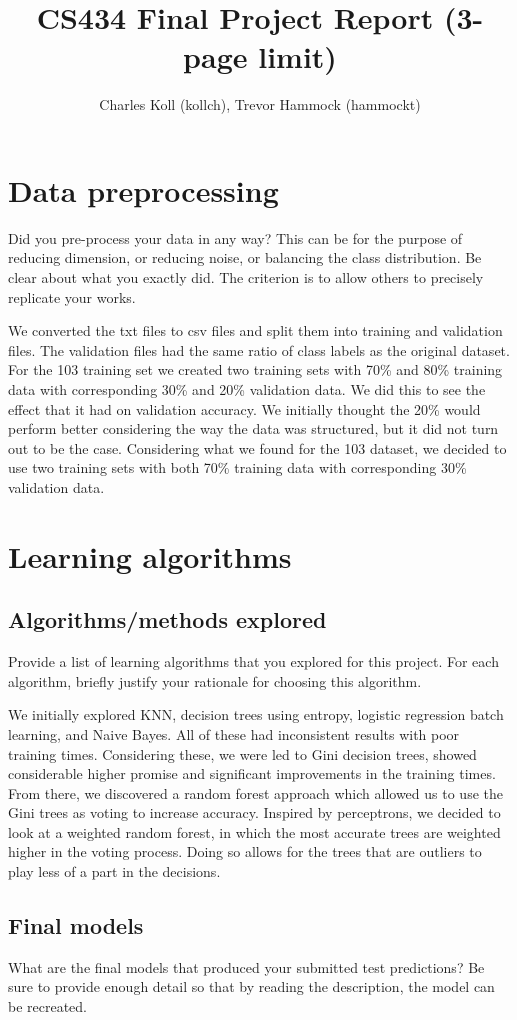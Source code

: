 \documentclass[10pt,a4paper]{article}
\title{CS434 Final Project Report (3-page limit)}
\author{Charles Koll (kollch), Trevor Hammock (hammockt)}
\date{}
\begin{document}
\maketitle
\section{Data preprocessing}
Did you pre-process your data in any way? This can be for the purpose of reducing dimension, or reducing noise, or balancing the class distribution. Be clear about what you exactly did. The criterion is to allow others to precisely replicate your works.

We converted the txt files to csv files and split them into training and validation files.
The validation files had the same ratio of class labels as the original dataset.
For the 103 training set we created two training sets with 70\% and 80\% training data with corresponding 30\% and 20\% validation data.
We did this to see the effect that it had on validation accuracy.
We initially thought the 20\% would perform better considering the way the data was structured, but it did not turn out to be the case.
Considering what we found for the 103 dataset, we decided to use two training sets with both 70\% training data with corresponding 30\% validation data.
\section{Learning algorithms}
\subsection{Algorithms/methods explored}
Provide a list of learning algorithms that you explored for this project. For each algorithm, briefly justify your rationale for choosing this algorithm.

We initially explored KNN, decision trees using entropy, logistic regression batch learning, and Naive Bayes.
All of these had inconsistent results with poor training times.
Considering these, we were led to Gini decision trees, showed considerable higher promise and significant improvements in the training times.
From there, we discovered a random forest approach which allowed us to use the Gini trees as voting to increase accuracy.
Inspired by perceptrons, we decided to look at a weighted random forest, in which the most accurate trees are weighted higher in the voting process. Doing so allows for the trees that are outliers to play less of a part in the decisions.
\subsection{Final models}
What are the final models that produced your submitted test predictions? Be sure to provide enough detail so that by reading the description, the model can be recreated.
\end{document}

